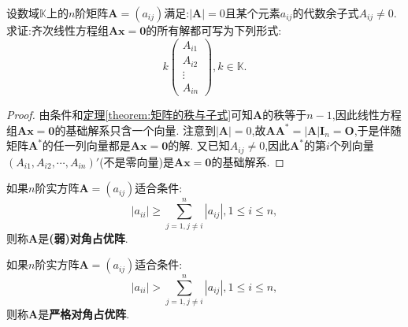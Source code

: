 \documentclass[../../main.tex]{subfiles}%
\begin{document}
\begin{proposition}\label{proposition:奇异系数矩阵Ax=0的解空间}
设数域\(\mathbb{K}\)上的\(n\)阶矩阵\(\boldsymbol{A}=(a_{ij})\)满足:\(|\boldsymbol{A}| = 0\)且某个元素\(a_{ij}\)的代数余子式\(A_{ij}\neq0\). 求证:齐次线性方程组\(\boldsymbol{A}\boldsymbol{x}=\boldsymbol{0}\)的所有解都可写为下列形式:
\[
k\begin{pmatrix}
A_{i1}\\
A_{i2}\\
\vdots\\
A_{in}
\end{pmatrix},k\in\mathbb{K}.
\]
\end{proposition}
\begin{proof}

由条件和\hyperref[theorem:矩阵的秩与子式]{定理\ref{theorem:矩阵的秩与子式}}可知\(\boldsymbol{A}\)的秩等于\(n - 1\),因此线性方程组\(\boldsymbol{A}\boldsymbol{x}=\boldsymbol{0}\)的基础解系只含一个向量. 注意到\(|\boldsymbol{A}| = 0\),故\(\boldsymbol{A}\boldsymbol{A}^*=|\boldsymbol{A}|\boldsymbol{I}_n=\boldsymbol{O}\),于是伴随矩阵\(\boldsymbol{A}^*\)的任一列向量都是\(\boldsymbol{A}\boldsymbol{x}=\boldsymbol{0}\)的解. 又已知\(A_{ij}\neq0\),因此\(\boldsymbol{A}^*\)的第\(i\)个列向量\((A_{i1},A_{i2},\cdots,A_{in})'\)(不是零向量)是\(\boldsymbol{A}\boldsymbol{x}=\boldsymbol{0}\)的基础解系.   

\end{proof}

\begin{definition}[对角占优阵]\label{definition:对角占优阵}
如果\(n\)阶实方阵\(\boldsymbol{A}=(a_{ij})\)适合条件:
\[
|a_{ii}|\geqslant \sum_{j = 1,j\neq i}^{n}|a_{ij}|,1\leqslant  i\leqslant  n,
\]
则称\(\boldsymbol{A}\)是\textbf{(弱)对角占优阵}.

如果\(n\)阶实方阵\(\boldsymbol{A}=(a_{ij})\)适合条件:
\[
|a_{ii}|>\sum_{j = 1,j\neq i}^{n}|a_{ij}|,1\leqslant  i\leqslant  n,
\]
则称\(\boldsymbol{A}\)是\textbf{严格对角占优阵}.
\end{definition}
\end{document}
